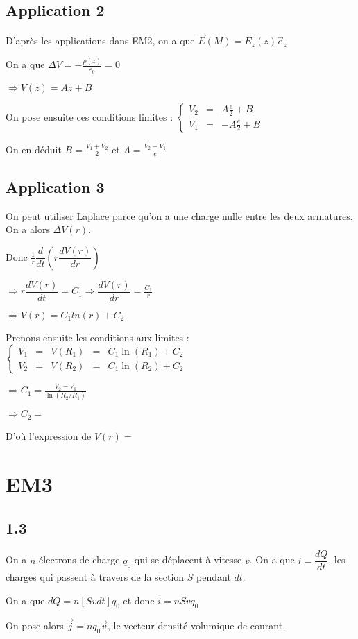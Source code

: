 \documentclass[a4paper,12pt]{book}
\begin{document}
\subsection{Application 2}
D'après les applications dans EM2, on a que $\vec{E}(M)=E_z(z)\vec{e}_z$ \par On a que $\Delta V=-\frac{\rho(z)}{\varepsilon_0}=0$ \par $\Rightarrow V(z)=Az+B$ \par On pose ensuite ces conditions limites : $\left\{\begin{array}{rcl} V_2 & = & A\frac{e}{2}+B \\ V_1 & = & -A\frac{e}{2}+B \end{array}\right.$ \par On en déduit $B=\frac{V_1+V_2}{2}$ et $A=\frac{V_2-V_1}{e}$

\subsection{Application 3}
On peut utiliser Laplace parce qu'on a une charge nulle entre les deux armatures. On a alors $\Delta V(r)$. \par Donc $\frac{1}{r}\dfrac{d}{dt}\left(r\dfrac{dV(r)}{dr}\right)$ \par $\Rightarrow r\dfrac{dV(r)}{dt} = C_1 \Rightarrow \dfrac{dV(r)}{dr}=\frac{C_1}{r}$ \par $\Rightarrow V(r)=C_1ln(r)+C_2$ 
\par Prenons ensuite les conditions aux limites : $\left\{\begin{array}{rcccl} V_1 & = & V(R_1) & = & C_1\ln(R_1)+C_2 \\ V_2 & = & V(R_2) & = & C_1\ln(R_2)+C_2 \end{array}\right.$ \par $\Rightarrow C_1=\frac{V_2-V_1}{\ln(R_2/R_1)}$ \par $\Rightarrow C_2=$ \par D'où l'expression de $V(r)=$


\section{EM3}
\subsection{1.3}
On a $n$ électrons de charge $q_0$ qui se déplacent à vitesse $v$. On a que $i=\dfrac{dQ}{dt}$, les charges qui passent à travers de la section $S$ pendant $dt$.\par  On a que $dQ=n[Svdt]q_0$ et donc $i=nSvq_0$ \par On pose alors $\vec{j}=nq_0\vec{v}$, le vecteur densité volumique de courant.
\end{document}
